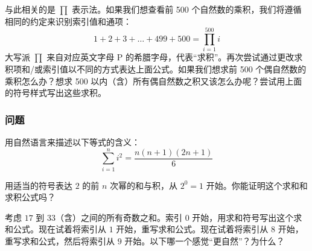 与此相关的是 $\prod$ 表示法。如果我们想查看前 500 个自然数的乘积，我们将遵循相同的约定来识别索引值和通项：
\[1+2+3+\dots+499+500 = \prod_{i=1}^{500}i\]
大写派 $\prod$ 来自对应英文字母 P 的希腊字母，代表“求积”。再次尝试通过更改求积项和/或索引值以不同的方式表达上面公式。如果我们想求前 500 个偶自然数的乘积怎么办？想求 500 以内（含）所有偶自然数之积又该怎么办呢？尝试用上面的符号样式写出这些求积。

\subsubsection*{问题}

\begin{problem}
    用自然语言来描述以下等式的含义：
    \[\sum_{i=1}^{n}i^2 = \frac{n(n+1)(2n+1)}{6}\]
\end{problem}
\begin{problem}
    用适当的符号表达 $2$ 的前 $n$ 次幂的和与积，从 $2^0=1$ 开始。你能证明这个求和和求积公式吗？
\end{problem}
\begin{problem}
    考虑 $17$ 到 $33$（含）之间的所有奇数之和。索引 $0$ 开始，用求和符号写出这个求和公式。现在试着将索引从 $1$ 开始，重写求和公式。现在试着将索引从 $8$ 开始，重写求和公式，然后将索引从 $9$ 开始。以下哪一个感觉“更自然”？为什么？
\end{problem}
